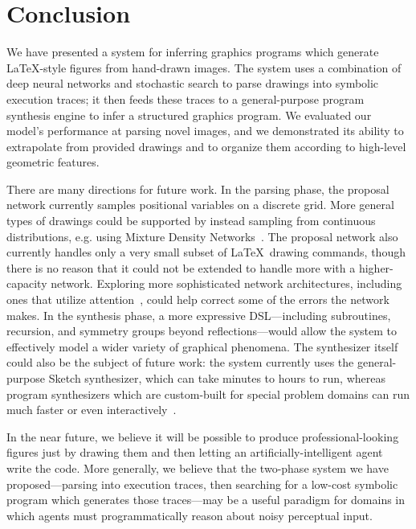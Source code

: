 \documentclass{article}
\begin{document}
\section{Conclusion}

We have presented a system for inferring graphics programs which generate \LaTeX-style figures from hand-drawn images. The system uses a combination of deep neural networks and stochastic search to parse drawings into symbolic execution traces; it then feeds these traces to a general-purpose program synthesis engine to infer a structured graphics program. We evaluated our model's performance at parsing novel images, and we demonstrated its ability to extrapolate from provided drawings and to organize them according to high-level geometric features.

There are many directions for future work. In the parsing phase, the proposal network currently samples positional variables on a discrete grid. More general types of drawings could be supported by instead sampling from continuous distributions, e.g. using Mixture Density Networks~\cite{MDN}. The proposal network also currently handles only a very small subset of \LaTeX~drawing commands, though there is no reason that it could not be extended to handle more with a higher-capacity network. Exploring more sophisticated network architectures, including ones that utilize attention~\cite{mnih2014recurrent}, could help correct some of the errors the network makes.
In the synthesis phase, a more expressive DSL---including subroutines, recursion, and symmetry groups beyond reflections---would allow the system to effectively model a wider variety of graphical phenomena. The synthesizer itself could also be the subject of future work: the system currently uses the general-purpose Sketch synthesizer, which can take minutes to hours to run, whereas program synthesizers which are custom-built for special problem domains can run much faster or even interactively~\cite{le2014flashextract}.

In the near future, we believe it will be possible to produce professional-looking figures just by drawing them and then letting an artificially-intelligent agent write the code.
More generally, we believe that the two-phase system we have proposed---parsing into execution traces, then searching for a low-cost symbolic program which generates those traces---may be a useful paradigm for domains in which agents must programmatically reason about noisy perceptual input.



%



{\small }
\end{document}
